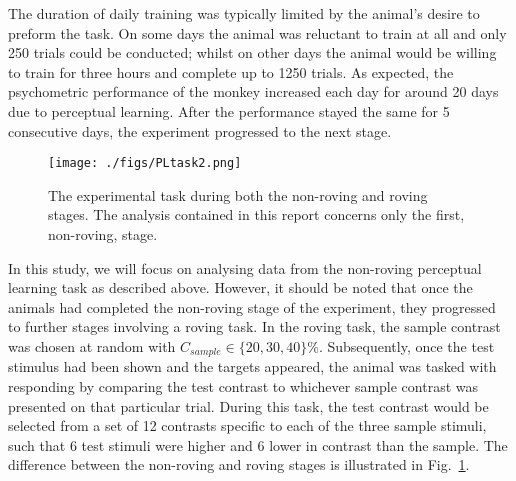 The duration of daily training was typically limited by the animal's desire to preform the task. On some days the animal was reluctant to train at all and only 250 trials could be conducted; whilst on other days the animal would be willing to train for three hours and complete up to 1250 trials.
As expected, the psychometric performance of the monkey increased each day for around 20 days due to perceptual learning. After the performance stayed the same for 5 consecutive days, the experiment progressed to the next stage.


\begin{figure}[htbp]
\begin{center}
\texttt{[image: ./figs/PLtask2.png]}
\end{center}
\caption{The experimental task during both the non-roving and roving stages. The analysis contained in this report concerns only the first, non-roving, stage.}
\label{fig:pltask2}
\end{figure}


In this study, we will focus on analysing data from the non-roving perceptual learning task as described above. However, it should be noted that once the animals had completed the non-roving stage of the experiment, they progressed to further stages involving a roving task. In the roving task, the sample contrast was chosen at random with $C_{sample} \in \{20, 30, 40\}\%$. Subsequently, once the test stimulus had been shown and the targets appeared, the animal was tasked with responding by comparing the test contrast to whichever sample contrast was presented on that particular trial. During this task, the test contrast would be selected from a set of 12 contrasts specific to each of the three sample stimuli, such that 6 test stimuli were higher and 6 lower in contrast than the sample. The difference between the non-roving and roving stages is illustrated in Fig.~\ref{fig:pltask2}.
%

